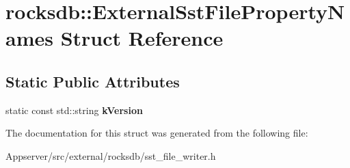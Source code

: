 \hypertarget{structrocksdb_1_1ExternalSstFilePropertyNames}{}\section{rocksdb\+:\+:External\+Sst\+File\+Property\+Names Struct Reference}
\label{structrocksdb_1_1ExternalSstFilePropertyNames}
\subsection*{Static Public Attributes}
\begin{DoxyCompactItemize}
\item 
static const std\+::string {\bfseries k\+Version}\hypertarget{structrocksdb_1_1ExternalSstFilePropertyNames_accb9b0ca917e37e71c524a171be69e01}{}\label{structrocksdb_1_1ExternalSstFilePropertyNames_accb9b0ca917e37e71c524a171be69e01}

\end{DoxyCompactItemize}


The documentation for this struct was generated from the following file\+:\begin{DoxyCompactItemize}
\item 
Appserver/src/external/rocksdb/sst\+\_\+file\+\_\+writer.\+h\end{DoxyCompactItemize}

